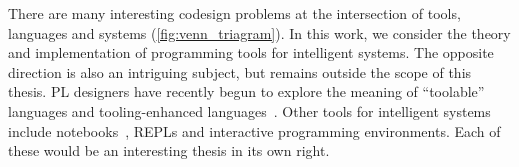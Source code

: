 There are many interesting codesign problems at the intersection of tools, languages and systems (\autoref{fig:venn_triagram}). In this work, we consider the theory and implementation of programming tools for intelligent systems. The opposite direction is also an intriguing subject, but remains outside the scope of this thesis. PL designers have recently begun to explore the meaning of ``toolable'' languages and tooling-enhanced languages~\citep{chatley2019next}. Other tools for intelligent systems include notebooks~\citep{chattopadhyays2020notebooks}, REPLs and interactive programming environments. Each of these would be an interesting thesis in its own right.

\begin{figure}

\end{figure}
